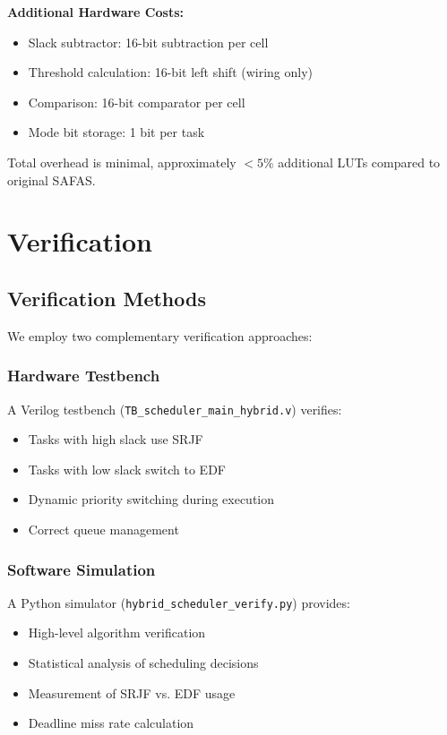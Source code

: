 \documentclass[conference]{IEEEtran}
\begin{document}
\textbf{Additional Hardware Costs:}
\begin{itemize}
    \item Slack subtractor: 16-bit subtraction per cell
    \item Threshold calculation: 16-bit left shift (wiring only)
    \item Comparison: 16-bit comparator per cell
    \item Mode bit storage: 1 bit per task
\end{itemize}

Total overhead is minimal, approximately $<5\%$ additional LUTs compared to original SAFAS.

\section{Verification}

\subsection{Verification Methods}

We employ two complementary verification approaches:

\subsubsection{Hardware Testbench}
A Verilog testbench (\texttt{TB\_scheduler\_main\_hybrid.v}) verifies:
\begin{itemize}
    \item Tasks with high slack use SRJF
    \item Tasks with low slack switch to EDF
    \item Dynamic priority switching during execution
    \item Correct queue management
\end{itemize}

\subsubsection{Software Simulation}
A Python simulator (\texttt{hybrid\_scheduler\_verify.py}) provides:
\begin{itemize}
    \item High-level algorithm verification
    \item Statistical analysis of scheduling decisions
    \item Measurement of SRJF vs. EDF usage
    \item Deadline miss rate calculation
\end{itemize}
\end{document}
